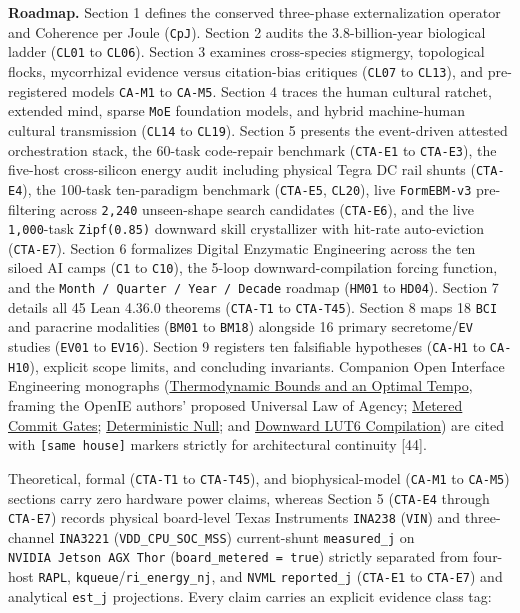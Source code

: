 \documentclass[10pt,letterpaper]{article}
\begin{document}
\textbf{Roadmap.} Section 1 defines the conserved three-phase
externalization operator and Coherence per Joule (\texttt{CpJ}). Section
2 audits the 3.8-billion-year biological ladder (\texttt{CL01} to
\texttt{CL06}). Section 3 examines cross-species stigmergy, topological
flocks, mycorrhizal evidence versus citation-bias critiques
(\texttt{CL07} to \texttt{CL13}), and pre-registered models
\texttt{CA-M1} to \texttt{CA-M5}. Section 4 traces the human cultural
ratchet, extended mind, sparse \texttt{MoE} foundation models, and
hybrid machine-human cultural transmission (\texttt{CL14} to
\texttt{CL19}). Section 5 presents the event-driven attested
orchestration stack, the 60-task code-repair benchmark (\texttt{CTA-E1}
to \texttt{CTA-E3}), the five-host cross-silicon energy audit including
physical Tegra DC rail shunts (\texttt{CTA-E4}), the 100-task
ten-paradigm benchmark (\texttt{CTA-E5}, \texttt{CL20}), live
\texttt{FormEBM-\allowbreak{}v3} pre-filtering across \texttt{2,240}
unseen-shape search candidates (\texttt{CTA-E6}), and the live
\texttt{1,000}-task \texttt{Zipf(\allowbreak{}0.\allowbreak{}85)} downward skill
crystallizer with hit-rate auto-eviction (\texttt{CTA-E7}). Section 6
formalizes Digital Enzymatic Engineering across the ten siloed AI camps
(\texttt{C1} to \texttt{C10}), the 5-loop downward-compilation forcing
function, and the \texttt{Month\ /\allowbreak{}\ Quarter\ /\allowbreak{}\ Year\ /\allowbreak{}\ Decade} roadmap
(\texttt{HM01} to \texttt{HD04}). Section 7 details all 45 Lean 4.36.0
theorems (\texttt{CTA-T1} to \texttt{CTA-T45}). Section 8 maps 18
\texttt{BCI} and paracrine modalities (\texttt{BM01} to \texttt{BM18})
alongside 16 primary secretome/\texttt{EV} studies (\texttt{EV01} to
\texttt{EV16}). Section 9 registers ten falsifiable hypotheses
(\texttt{CA-H1} to \texttt{CA-H10}), explicit scope limits, and
concluding invariants. Companion Open Interface Engineering monographs
(\href{https://research.openie.dev/papers/agency/}{Thermodynamic Bounds
and an Optimal Tempo}, framing the OpenIE authors' proposed Universal
Law of Agency; \href{https://research.openie.dev/papers/gates/}{Metered
Commit Gates};
\href{https://research.openie.dev/papers/deterministic-null/}{Deterministic
Null}; and \href{https://research.openie.dev/papers/lut-adapt/}{Downward
LUT6 Compilation}) are cited with \texttt{{[}same\ house{]}} markers
strictly for architectural continuity {[}44{]}.

Theoretical, formal (\texttt{CTA-T1} to \texttt{CTA-T45}), and
biophysical-model (\texttt{CA-M1} to \texttt{CA-M5}) sections carry zero
hardware power claims, whereas Section 5 (\texttt{CTA-E4} through
\texttt{CTA-E7}) records physical board-level Texas Instruments
\texttt{INA238} (\texttt{VIN}) and three-channel \texttt{INA3221}
(\texttt{VDD\_\allowbreak{}CPU\_\allowbreak{}SOC\_\allowbreak{}MSS}) current-shunt \texttt{measured\_\allowbreak{}j} on
\texttt{NVIDIA\ Jetson\ AGX\ Thor} (\texttt{board\_\allowbreak{}metered\ =\ true})
strictly separated from four-host \texttt{RAPL},
\texttt{kqueue}/\allowbreak{}\texttt{ri\_\allowbreak{}energy\_\allowbreak{}nj}, and \texttt{NVML}
\texttt{reported\_\allowbreak{}j} (\texttt{CTA-E1} to \texttt{CTA-E7}) and analytical
\texttt{est\_j} projections. Every claim carries an explicit evidence
class tag:
\end{document}
